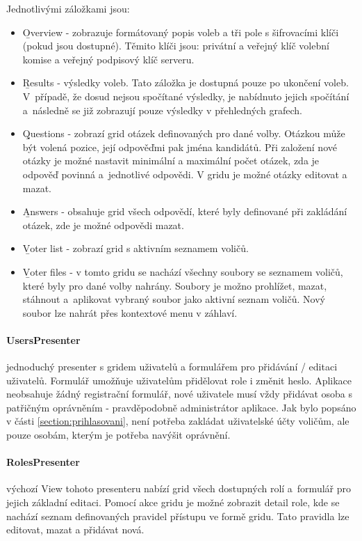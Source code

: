 Jednotlivými záložkami jsou:
\begin{itemize}
	\item \b{Overview} - zobrazuje formátovaný popis voleb a tři pole s šifrovacími klíči (pokud jsou dostupné). Těmito klíči jsou: privátní a veřejný klíč volební komise a veřejný podpisový klíč serveru.
	\item \b{Results} - výsledky voleb. Tato záložka je dostupná pouze po ukončení voleb. V~případě, že dosud nejsou spočítané výsledky, je nabídnuto jejich spočítání a~následně se již zobrazují pouze výsledky v přehledných grafech.
	\item \b{Questions} - zobrazí grid otázek definovaných pro dané volby. Otázkou může být volená pozice, její odpověďmi pak jména kandidátů. Při založení nové otázky je možné nastavit minimální a maximální počet otázek, zda je odpověď povinná a~jednotlivé odpovědi. V gridu je možné otázky editovat a mazat.
	
	\item \b{Answers} - obsahuje grid všech odpovědí, které byly definované při zakládání otázek, zde je možné odpovědi mazat.
	
	\item \b{Voter list} - zobrazí grid s aktivním seznamem voličů.
	
	\item \b{Voter files} - v tomto gridu se nachází všechny soubory se seznamem voličů, které byly pro dané volby nahrány. Soubory je možno prohlížet, mazat, stáhnout a~aplikovat vybraný soubor jako aktivní seznam voličů. Nový soubor lze nahrát přes kontextové menu v záhlaví.
	
\end{itemize}


\paragraph{UsersPresenter} jednoduchý presenter s gridem uživatelů a formulářem pro přidávání / editaci uživatelů. Formulář umožňuje uživatelům přidělovat role i změnit heslo. Aplikace neobsahuje žádný registrační formulář, nové uživatele musí vždy přidávat osoba s patřičným oprávněním - pravděpodobně administrátor aplikace. Jak bylo popsáno v části \ref{section:prihlasovani}, není potřeba zakládat uživatelské účty voličům, ale pouze osobám, kterým je potřeba navýšit oprávnění.

\paragraph{RolesPresenter} výchozí View tohoto presenteru nabízí grid všech dostupných rolí a~formulář pro jejich základní editaci. Pomocí akce gridu je možné zobrazit detail role, kde se nachází seznam definovaných pravidel přístupu ve formě gridu. Tato pravidla lze editovat, mazat a přidávat nová.


